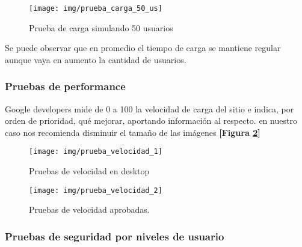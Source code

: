   \begin{figure}[h]
  	\centering
  	\texttt{[image: img/prueba\_carga\_50\_us]}
  	\caption{Prueba de carga simulando 50 usuarios}
  	\label{retro_prueba_carga_50_us}
  \end{figure}
  
  Se puede observar que en promedio el tiempo de carga se mantiene regular aunque vaya en aumento la cantidad de usuarios.
  
  \subsubsection{Pruebas de performance}
  Google developers mide de 0 a 100 la velocidad de carga del sitio e indica, por orden de prioridad, qué mejorar, aportando información al respecto.
  en nuestro caso nos recomienda disminuir el tamaño de las imágenes \textbf{[Figura \ref{retro_prueba_velocidad_1}]}
  
  \newpage
  
  \begin{figure}[h]
  	\centering
  	\texttt{[image: img/prueba\_velocidad\_1]}
  	\caption{Pruebas de velocidad en desktop}
  	\label{retro_prueba_velocidad_1}
  \end{figure}
  
  \begin{figure}[h]
  	\centering
  	\texttt{[image: img/prueba\_velocidad\_2]}
  	\caption{Pruebas de velocidad aprobadas.}
  	\label{retro_prueba_velocidad_2}
  \end{figure}
  
  
  \subsubsection{Pruebas de seguridad por niveles de usuario}
  
